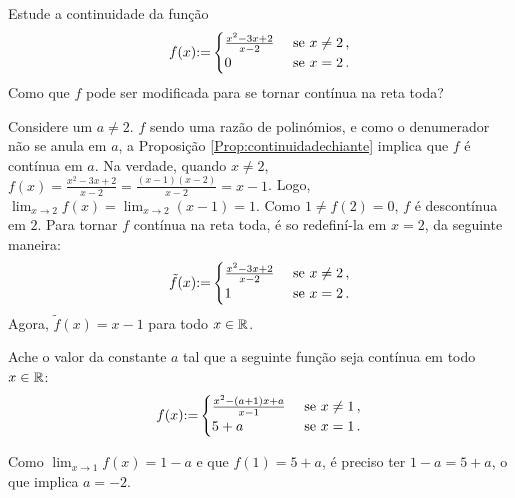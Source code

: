 \begin{exo}
Estude a continuidade da função
$$
f(x){:=}
\begin{cases}
\frac{x^2-3x+2}{x-2}&\text{ se }x\neq 2\,,\\
0&\text{ se }x=2\,.
\end{cases}
$$
Como que $f$ pode ser modificada para se tornar contínua na reta toda?
\begin{sol}
Considere um $a\neq 2$. $f$ sendo uma razão de polinómios, e como o denumerador não se
anula em $a$, a Proposição
\ref{Prop:continuidadechiante} implica que $f$ é contínua em $a$.
Na verdade, quando $x\neq 2$, $f(x)=\frac{x^2-3x+2}{x-2}=\frac{(x-1)(x-2)}{x-2}=x-1$.
Logo, $\lim_{x\to 2}f(x)=\lim_{x\to 2}(x-1)=1$. Como $1\neq f(2)=0$, $f$ é descontínua em
$2$.
Para tornar $f$ contínua na reta toda, é so redefiní-la em $x=2$, da seguinte maneira:
$$
\tilde{f}(x){:=}
\begin{cases}
\frac{x^2-3x+2}{x-2}&\text{ se }x\neq 2\,,\\
1&\text{ se }x=2\,.
\end{cases}
$$
Agora, $\tilde{f}(x)=x-1$ para todo $x\in \mathbb{R}$.
\end{sol}
\end{exo}

\begin{exo}
Ache o valor da constante $a$ tal que a seguinte função seja contínua em todo
$x\in \mathbb{R}$:
$$f(x){:=}
\begin{cases}
\frac{x^2-(a+1)x+a}{x-1}&\text{ se }x\neq 1\,,\\
5+a&\text{ se }x=1\,.
\end{cases}
$$
\begin{sol}
Como $\lim_{x\to 1}f(x)=1-a$ e que $f(1)=5+a$, é preciso ter $1-a=5+a$, o que implica
$a=-2$.
\end{sol}
\end{exo}



